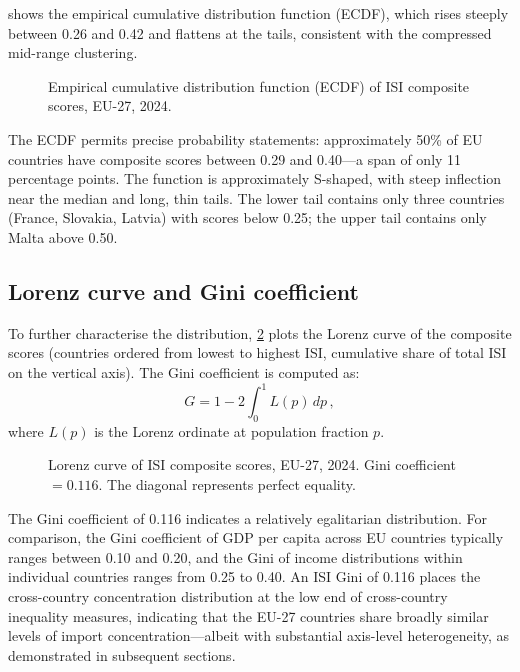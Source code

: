  shows the empirical cumulative distribution function
(ECDF), which rises steeply between 0.26 and 0.42 and flattens at
the tails, consistent with the compressed mid-range clustering.

\begin{figure}[htbp]
\centering

\caption{Empirical cumulative distribution function (ECDF) of ISI
  composite scores, EU-27, 2024.}
\label{fig:ecdf}
\end{figure}

The ECDF permits precise probability statements: approximately 50\%
of EU countries have composite scores between 0.29 and 0.40---a span
of only 11 percentage points.  The function is approximately
S-shaped, with steep inflection near the median and long, thin tails.
The lower tail contains only three countries (France, Slovakia,
Latvia) with scores below 0.25; the upper tail contains only Malta
above 0.50.

\subsection{Lorenz curve and Gini coefficient}

To further characterise the distribution, \cref{fig:lorenz} plots
the Lorenz curve of the composite scores (countries ordered from
lowest to highest ISI, cumulative share of total ISI on the vertical
axis).  The Gini coefficient is computed as:
\begin{equation}\label{eq:gini}
  G = 1 - 2\int_0^1 L(p)\,dp\,,
\end{equation}
where $L(p)$ is the Lorenz ordinate at population fraction $p$.

\begin{figure}[htbp]
\centering

\caption{Lorenz curve of ISI composite scores, EU-27, 2024.
  Gini coefficient $= 0.116$.  The diagonal represents perfect
  equality.}
\label{fig:lorenz}
\end{figure}

The Gini coefficient of 0.116 indicates a relatively egalitarian
distribution.  For comparison, the Gini coefficient of GDP per capita
across EU countries typically ranges between 0.10 and 0.20, and the
Gini of income distributions within individual countries ranges from
0.25 to 0.40.  An ISI Gini of 0.116 places the cross-country
concentration distribution at the low end of cross-country inequality
measures, indicating that the EU-27 countries share broadly similar
levels of import concentration---albeit with substantial axis-level
heterogeneity, as demonstrated in subsequent sections.

